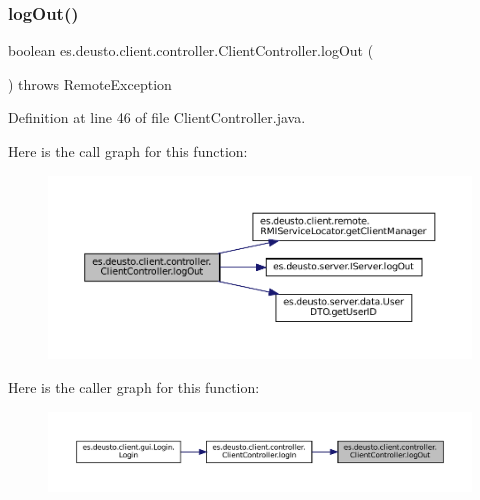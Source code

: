 \subsubsection{\texorpdfstring{logOut()}{logOut()}}
{\footnotesize\ttfamily boolean es.\+deusto.\+client.\+controller.\+Client\+Controller.\+log\+Out (\begin{DoxyParamCaption}{ }\end{DoxyParamCaption}) throws Remote\+Exception}



Definition at line 46 of file Client\+Controller.\+java.

Here is the call graph for this function\+:
\nopagebreak
\begin{figure}[H]
\begin{center}
\leavevmode
\includegraphics[width=350pt]{classes_1_1deusto_1_1client_1_1controller_1_1_client_controller_a9379da9c24d71d3ebafaa44e0f858340_cgraph}
\end{center}
\end{figure}
Here is the caller graph for this function\+:
\nopagebreak
\begin{figure}[H]
\begin{center}
\leavevmode
\includegraphics[width=350pt]{classes_1_1deusto_1_1client_1_1controller_1_1_client_controller_a9379da9c24d71d3ebafaa44e0f858340_icgraph}
\end{center}
\end{figure}
\mbox{\label{classes_1_1deusto_1_1client_1_1controller_1_1_client_controller_a8f77e4957f536e48d7012d643d2c6cb8}} 
